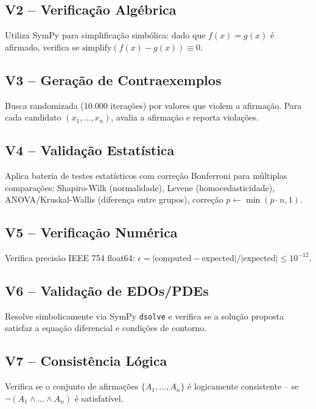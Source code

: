 \documentclass[12pt,a4paper,sumario=tradicional]{abntex2}
\begin{document}
\subsection{V2 -- Verificação Algébrica}

Utiliza SymPy para simplificação simbólica: dado que $f(x) = g(x)$ é afirmado, verifica se $\text{simplify}(f(x) - g(x)) \equiv 0$.

\subsection{V3 -- Geração de Contraexemplos}

Busca randomizada (10.000 iterações) por valores que violem a afirmação. Para cada candidato $(x_1, \ldots, x_n)$, avalia a afirmação e reporta violações.

\subsection{V4 -- Validação Estatística}

Aplica bateria de testes estatísticos com correção Bonferroni para múltiplas comparações: Shapiro-Wilk (normalidade), Levene (homocedasticidade), ANOVA/Kruskal-Wallis (diferença entre grupos), correção $p \leftarrow \min(p \cdot n, 1)$.

\subsection{V5 -- Verificação Numérica}

Verifica precisão IEEE 754 float64: $\epsilon = |\text{computed} - \text{expected}| / |\text{expected}| \leq 10^{-12}$.

\subsection{V6 -- Validação de EDOs/PDEs}

Resolve simbolicamente via SymPy \texttt{dsolve} e verifica se a solução proposta satisfaz a equação diferencial e condições de contorno.

\subsection{V7 -- Consistência Lógica}

Verifica se o conjunto de afirmações $\{A_1, \ldots, A_n\}$ é logicamente consistente -- se $\neg(A_1 \land \ldots \land A_n)$ é satisfatível.
\end{document}
